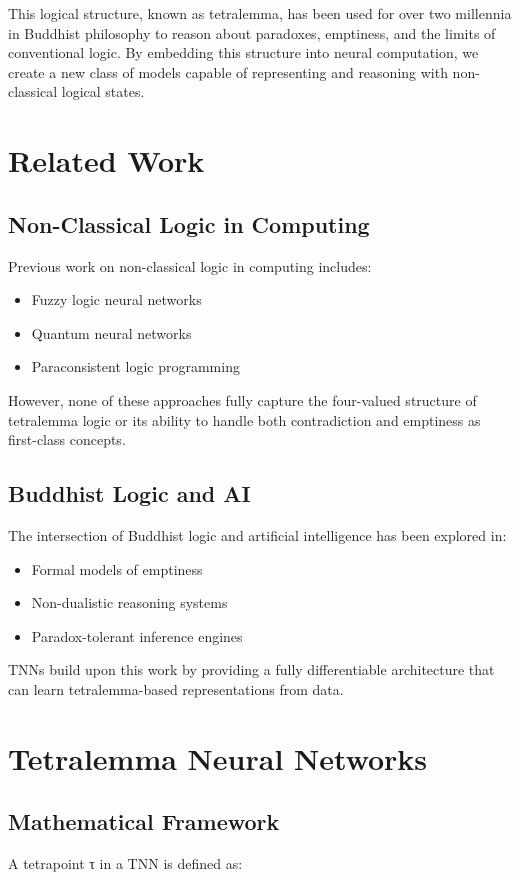 \documentclass[10pt,journal,compsoc]{IEEEtran}
\begin{document}
This logical structure, known as tetralemma, has been used for over two millennia in Buddhist philosophy to reason about paradoxes, emptiness, and the limits of conventional logic. By embedding this structure into neural computation, we create a new class of models capable of representing and reasoning with non-classical logical states.

\section{Related Work}
\subsection{Non-Classical Logic in Computing}
Previous work on non-classical logic in computing includes:
\begin{itemize}
\item Fuzzy logic neural networks \cite{fuzzy}
\item Quantum neural networks \cite{quantum}
\item Paraconsistent logic programming \cite{para}
\end{itemize}

However, none of these approaches fully capture the four-valued structure of tetralemma logic or its ability to handle both contradiction and emptiness as first-class concepts.

\subsection{Buddhist Logic and AI}
The intersection of Buddhist logic and artificial intelligence has been explored in:
\begin{itemize}
\item Formal models of emptiness \cite{empty}
\item Non-dualistic reasoning systems \cite{nondual}
\item Paradox-tolerant inference engines \cite{paradox}
\end{itemize}

TNNs build upon this work by providing a fully differentiable architecture that can learn tetralemma-based representations from data.

\section{Tetralemma Neural Networks}
\subsection{Mathematical Framework}
A tetrapoint τ in a TNN is defined as:
\end{document}
